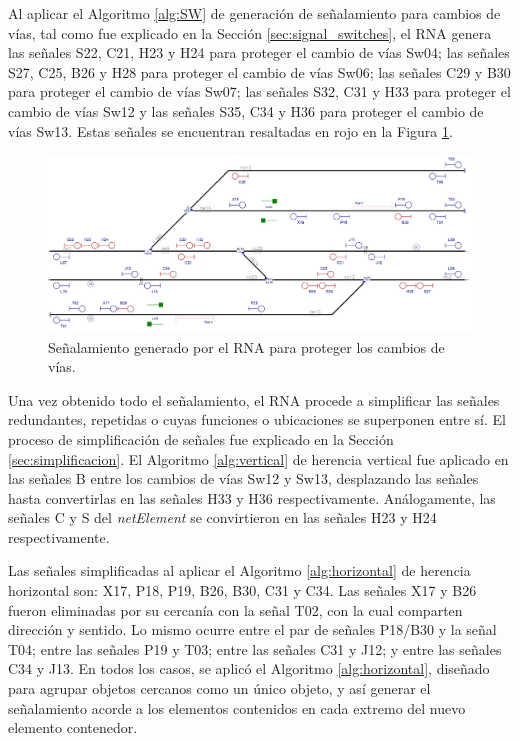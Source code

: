 	Al aplicar el Algoritmo \ref{alg:SW} de generación de señalamiento para cambios de vías, tal como fue explicado en la Sección \ref{sec:signal_switches}, el RNA genera las señales S22, C21, H23 y H24 para proteger el cambio de vías Sw04; las señales S27, C25, B26 y H28 para proteger el cambio de vías Sw06; las señales C29 y B30 para proteger el cambio de vías Sw07; las señales S32, C31 y H33 para proteger el cambio de vías Sw12 y las señales S35, C34 y H36 para proteger el cambio de vías Sw13. Estas señales se encuentran resaltadas en rojo en la Figura \ref{fig:EJ1_6}.
	
	\begin{figure}[H]
		\centering
		\includegraphics[width=1\textwidth]{resultados-obtenidos/ejemplo1/images/1_step4.png}
		\centering\caption{Señalamiento generado por el RNA para proteger los cambios de vías.}
		\label{fig:EJ1_6}
	\end{figure}
	
	Una vez obtenido todo el señalamiento, el RNA procede a simplificar las señales redundantes, repetidas o cuyas funciones o ubicaciones se superponen entre sí. El proceso de simplificación de señales fue explicado en la Sección \ref{sec:simplificacion}. El Algoritmo \ref{alg:vertical} de herencia vertical fue aplicado en las señales B entre los cambios de vías Sw12 y Sw13, desplazando las señales hasta convertirlas en las señales H33 y H36 respectivamente. Análogamente, las señales C y S del \textit{netElement} se convirtieron en las señales H23 y H24 respectivamente.
	
	Las señales simplificadas al aplicar el Algoritmo \ref{alg:horizontal} de herencia horizontal son: X17, P18, P19, B26, B30, C31 y C34. Las señales X17 y B26 fueron eliminadas por su cercanía con la señal T02, con la cual comparten dirección y sentido. Lo mismo ocurre entre el par de señales P18/B30 y la señal T04; entre las señales P19 y T03; entre las señales C31 y J12; y entre las señales C34 y J13. En todos los casos, se aplicó el Algoritmo \ref{alg:horizontal}, diseñado para agrupar objetos cercanos como un único objeto, y así generar el señalamiento acorde a los elementos contenidos en cada extremo del nuevo elemento contenedor.
	
